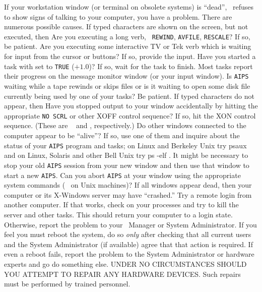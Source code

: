     If your workstation window (or terminal on obsolete systems) is
``dead'', \ie\ refuses to show signs of talking to your computer, you
have a problem. There are numerous possible causes.  If typed
characters are shown on the screen, but not executed, then
\xben
\Item Are you executing a long verb, \eg\ {\tt REWIND}, {\tt AVFILE},
      {\tt RESCALE}?  If so, be patient.
\Item Are you executing some interactive TV or Tek verb which is
      waiting for input from the cursor or buttons?  If so, provide
      the input.
\Item Have you started a task with {\tt {}} set to
      {\tt TRUE} ($+1.0$)?  If so, wait for the task to finish.  Most
      tasks report their progress on the message monitor window (or
      your input window).
\Item Is {\tt AIPS} waiting while a tape rewinds or skips files
      or is it waiting to open some disk file currently being used by
      one of your tasks?  Be patient.
\xeen
\noindent If typed characters do not appear, then
\xben
\Item Have you stopped output to your window accidentally by
      hitting the appropriate {\tt NO SCRL} or other XOFF control
      sequence?  If so, hit the XON control sequence. (These are {\tt
      } and {\tt {}}, respectively.)
\Item Do other windows connected to the computer appear to be
      ``alive''?  If so, use one of them and inquire about the status
      of your {\tt AIPS} program and tasks; on Linux and Berkeley Unix
      try {\us ps\qs aux \CR} and on Linux, Solaris and other Bell
      Unix try {\us ps -elf \hbox{\CR}}.  It might be necessary to
      stop your old {\tt AIPS} session from your new window and then
      use that window to start a new {\tt AIPS}\@.
\Item Can you abort {\tt AIPS} at your window using the appropriate
      system commands (\ie\ {\tt {}} on Unix machines)?
\Item If all windows appear dead, then your computer or its
      X-Windows server may have ``crashed.''  Try a remote login from
      another computer.  If that works, check on your processes and
      try to kill the server and other tasks.  This should return your
      computer to a login state.  Otherwise, report the problem to
      your \AIPS\ Manager or System Administrator.  If you feel you
      must reboot the system, do so {\it only\/} after checking that
      all current users and the System Administrator (if available)
      agree that that action is required.
\Item If even a reboot fails, report the problem to the System
      Administrator or hardware experts and go do something else.
      UNDER NO CIRCUMSTANCES SHOULD YOU ATTEMPT TO REPAIR ANY
      HARDWARE DEVICES. Such repairs must be performed by trained
      personnel.
\xeen


